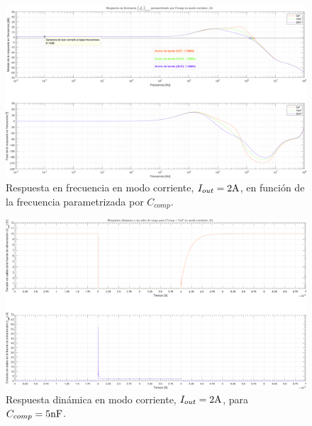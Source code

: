 \clearpage

\begin{figure}[H] %
\begin{center}
\includegraphics[width=1.1 \textwidth, angle=90]{./img/plots/rf/power_supply_CCOMP_RF_Modo3.png}
\caption{\label{fig:fig_power_supply_CCOMP_RF_Modo3}\footnotesize{Respuesta en frecuencia en modo corriente, $I_{out} = 2 \si[per-mode=symbol]{\ampere}$, en función de la frecuencia parametrizada por $C_{comp}$.}}
\end{center}
\end{figure}

\clearpage

\begin{figure}[H] %
\begin{center}
\includegraphics[width=1.1 \textwidth, angle=90]{./img/plots/dynamic/power_supply_CCOMP_5n_STEP_Modo3.png}
\caption{\label{fig:fig_power_supply_CCOMP_STEP_5n_Modo3}\footnotesize{Respuesta dinámica en modo corriente, $I_{out} = 2 \si[per-mode=symbol]{\ampere}$, para $C_{comp} = 5 \si[per-mode=symbol]{\nano\farad} $.}}
\end{center}
\end{figure}

